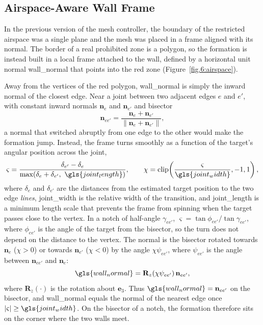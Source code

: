 \subsection{Airspace-Aware Wall Frame} \label{sec.6:wall_frame}

In the previous version of the mesh controller, the boundary of the restricted airspace was a single plane and the mesh was placed in a frame aligned with its normal. The border of a real prohibited zone is a polygon, so the formation is instead built in a local frame attached to the wall, defined by a horizontal unit normal \gls{wall_normal} that points into the red zone (Figure~\ref{fig.6:airspace}).

Away from the vertices of the red polygon, \gls{wall_normal} is simply the inward normal of the closest edge. Near a joint between two adjacent edges $e$ and $e'$, with constant inward normals $\mathbf{n}_e$ and $\mathbf{n}_{e'}$ and bisector
\begin{equation}
    \mathbf{n}_{ee'}=\frac{\mathbf{n}_e+\mathbf{n}_{e'}}{\|\mathbf{n}_e+\mathbf{n}_{e'}\|},
\end{equation}
a normal that switched abruptly from one edge to the other would make the formation jump. Instead, the frame turns smoothly as a function of the target's angular position across the joint,
\begin{equation}
    \varsigma = \frac{\delta_{e'}-\delta_e}{\max(\delta_e+\delta_{e'},\ \gls{joint_length})},
    \qquad
    \chi=\operatorname{clip}\!\left(\frac{\varsigma}{\gls{joint_width}},-1,1\right),
    \label{eq.6:joint}
\end{equation}
where $\delta_e$ and $\delta_{e'}$ are the distances from the estimated target position to the two edge \emph{lines}, \gls{joint_width} is the relative width of the transition, and \gls{joint_length} is a minimum length scale that prevents the frame from spinning when the target passes close to the vertex. In a notch of half-angle $\gamma_{ee'}$, $\varsigma=\tan\phi_{ee'}/\tan\gamma_{ee'}$, where $\phi_{ee'}$ is the angle of the target from the bisector, so the turn does not depend on the distance to the vertex. The normal is the bisector rotated towards $\mathbf{n}_e$ ($\chi>0$) or towards $\mathbf{n}_{e'}$ ($\chi<0$) by the angle $\chi\psi_{ee'}$, where $\psi_{ee'}$ is the angle between $\mathbf{n}_{ee'}$ and $\mathbf{n}_e$:
\begin{equation}
    \gls{wall_normal} = \mathbf{R}_z(\chi\psi_{ee'})\,\mathbf{n}_{ee'},
    \label{eq.6:normal_rotation}
\end{equation}
where $\mathbf{R}_z(\cdot)$ is the rotation about $\mathbf{e}_3$. Thus $\gls{wall_normal}=\mathbf{n}_{ee'}$ on the bisector, and \gls{wall_normal} equals the normal of the nearest edge once $|\varsigma|\ge\gls{joint_width}$. On the bisector of a notch, the formation therefore sits on the corner where the two walls meet.

